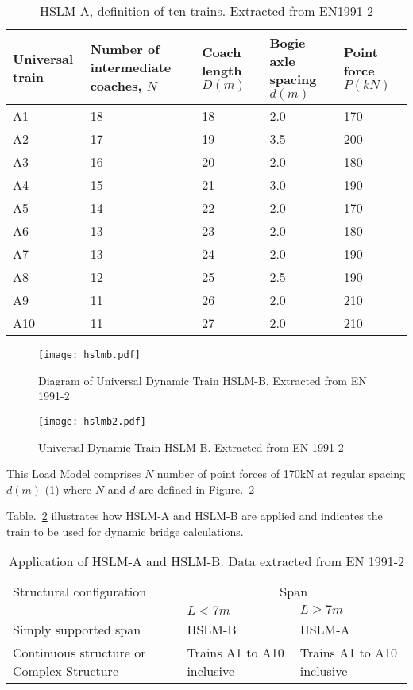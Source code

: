 \begin{table}[h]\footnotesize
	\centering
	\begin{tabular}{p{2cm}p{2cm}p{2cm}p{2cm}p{2cm}}
		\hline
		Universal train & Number of intermediate coaches, $ N $ & Coach length $ D(m) $ & Bogie axle spacing $ d (m) $ & Point force $ P (kN) $ \\
		\hline
		A1 & 18 & 18 & 2.0 & 170 \\
		A2 & 17 & 19 & 3.5 & 200 \\
		A3 & 16 & 20 & 2.0 & 180 \\
		A4 & 15 & 21 & 3.0 & 190 \\
		A5 & 14 & 22 & 2.0 & 170 \\
		A6 & 13 & 23 & 2.0 & 180 \\
		A7 & 13 & 24 & 2.0 & 190 \\
		A8 & 12 & 25 & 2.5 & 190 \\
		A9 & 11 & 26 & 2.0 & 210 \\
		A10 & 11 & 27 & 2.0 & 210 \\			
		\hline		
	\end{tabular}
	\caption{HSLM-A, definition of ten trains. Extracted from EN1991-2\cite{EC12}}
	\label{tab:hslma}
\end{table}

\begin{figure}[h]
	\centering
	\texttt{[image: hslmb.pdf]}
	\caption{Diagram of Universal Dynamic Train HSLM-B. Extracted from EN 1991-2\cite{EC12}}
	\label{fig:hslmbdiagram}
\end{figure}

\begin{figure}[h]
	\centering
	\texttt{[image: hslmb2.pdf]}
	\caption{Universal Dynamic Train HSLM-B. Extracted from EN 1991-2\cite{EC12}}
	\label{fig:hslmbtable}
\end{figure}

This Load Model comprises $ N $ number of point forces of 170kN at regular spacing $ d(m) $ (\ref{fig:hslmbdiagram}) where $ N $ and $ d $ are defined in Figure.~\ref{fig:hslmbtable}

Table.~\ref{hslmapplication} illustrates how HSLM-A and HSLM-B are applied and indicates the train to be used for dynamic bridge calculations.

\begin{table}[h] \scriptsize
	\begin{tabular}{lll}
		\hline
		Structural configuration & \multicolumn{2}{c}{Span} \\
		& $ L<7m $ & $ L\geq 7m $ \\
		\hline
		Simply supported span & HSLM-B & HSLM-A \\
		Continuous structure or Complex Structure & Trains A1 to A10 inclusive & Trains A1 to A10 inclusive\\
	\end{tabular}
	\caption{Application of HSLM-A and HSLM-B. Data extracted from EN 1991-2\cite{EC12}}
	\label{hslmapplication}
\end{table}

